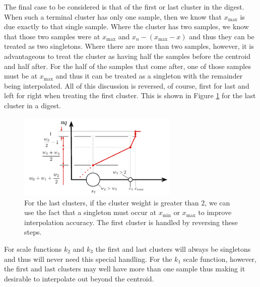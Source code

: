 \documentclass[]{statsoc}
\begin{document}
The final case to be considered is that of the first or last cluster in the digest. 
When such a terminal cluster has only one sample, then we know that $x_{\mathrm {max}}$ is due exactly to that single sample. Where the cluster has two samples, we know that those two samples were at $x_{\mathrm {max}}$ and $x_n-(x_{\mathrm {max}}-x)$ and thus they can be treated as two singletons. Where there are more than two samples, however, it is advantageous to treat the cluster as having half the samples before the centroid and half after. For the half of the samples that come after, one of those samples must be at $x_{\mathrm {max}}$ and thus it can be treated as a singleton with the remainder being interpolated. All of this discussion is reversed, of course, first for last and left for right when treating the first cluster. This is shown in Figure \ref{fig:endpoint} for the last cluster in a digest.
\begin{figure}[htb] %
   \centering
   \includegraphics[width=3in]{figures/endpoint.pdf} 
   \caption{For the last clusters, if the cluster weight is greater than $2$, we can use the fact that a singleton must occur at $x_{\mathrm {min}}$ or $x_{\mathrm {max}}$ to improve interpolation accuracy. The first cluster is handled by reversing these steps.}
   \label{fig:endpoint}
\end{figure}

For scale functions $k_2$ and $k_3$ the first and last clusters will always be singletons and thus will never need this special handling. For the $k_1$ scale function, however, the first and last clusters may well have more than one sample thus making it desirable to interpolate out beyond the centroid. 
\end{document}
